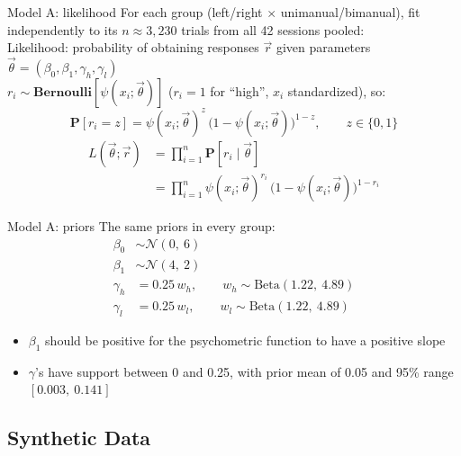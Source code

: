 \begin{frame}{Model A: likelihood}
  For each group (left/right $\times$ unimanual/bimanual), fit independently to its
  $n \approx 3{,}230$ trials from all 42 sessions pooled:\\[0.3em]
  Likelihood: probability of obtaining responses $\vec{r}$ given parameters
  $\vec{\theta} = (\beta_0, \beta_1, \gamma_h, \gamma_l)$\\
  $r_i \sim \mathbf{Bernoulli}[\psi(x_i;\vec{\theta})]$ ($r_i = 1$ for ``high'', $x_i$ standardized), so:
  \[
    \mathbf{P}[r_i = z] = \psi(x_i;\vec{\theta})^{z}\,\big(1-\psi(x_i;\vec{\theta})\big)^{1-z},
    \qquad z \in \{0, 1\}
  \]
  \begin{align*}
    L(\vec{\theta};\vec{r}) &= \prod_{i=1}^{n} \mathbf{P}[r_i \mid \vec{\theta}]\\
    &= \prod_{i=1}^{n} \psi(x_i;\vec{\theta})^{r_i}\,\big(1-\psi(x_i;\vec{\theta})\big)^{1-r_i}
  \end{align*}
\end{frame}

\begin{frame}{Model A: priors}
  The same priors in every group:
  \begin{align*}
    \beta_0 &\sim \mathcal{N}(0,\ 6) \\
    \beta_1 &\sim \mathcal{N}(4,\ 2) \\
    \gamma_h &= 0.25\, w_h, \qquad w_h \sim \text{Beta}(1.22,\ 4.89) \\
    \gamma_l &= 0.25\, w_l, \qquad w_l \sim \text{Beta}(1.22,\ 4.89)
  \end{align*}
  \begin{itemize}
    \item $\beta_1$ should be positive for the psychometric function to have a positive slope
    \item $\gamma$'s have support between 0 and 0.25, with prior mean of 0.05 and 95\% range
          $[0.003,\ 0.141]$
  \end{itemize}
\end{frame}

\subsection{Synthetic Data}

